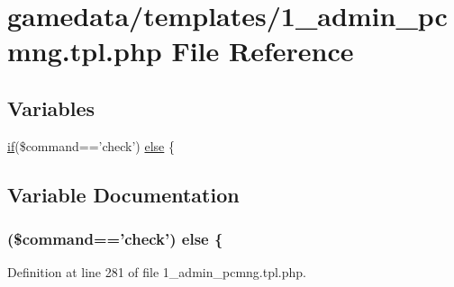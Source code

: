 \hypertarget{1__admin__pcmng_8tpl_8php}{\section{gamedata/templates/1\+\_\+admin\+\_\+pcmng.tpl.\+php File Reference}
\label{1__admin__pcmng_8tpl_8php}
}
\subsection*{Variables}
\begin{DoxyCompactItemize}
\item 
\hyperlink{login__old_8php_a4ac1118c2e44c513a674bc1793ba6c90}{if}(\$command=='check') \hyperlink{1__admin__pcmng_8tpl_8php_a7fa2566c59342c05e46c44b306c6a386}{else} \{
\end{DoxyCompactItemize}


\subsection{Variable Documentation}
\hypertarget{1__admin__pcmng_8tpl_8php_a7fa2566c59342c05e46c44b306c6a386}{
\subsubsection[{else}]{ (\$command=='check') else \{}}\label{1__admin__pcmng_8tpl_8php_a7fa2566c59342c05e46c44b306c6a386}


Definition at line 281 of file 1\+\_\+admin\+\_\+pcmng.\+tpl.\+php.

